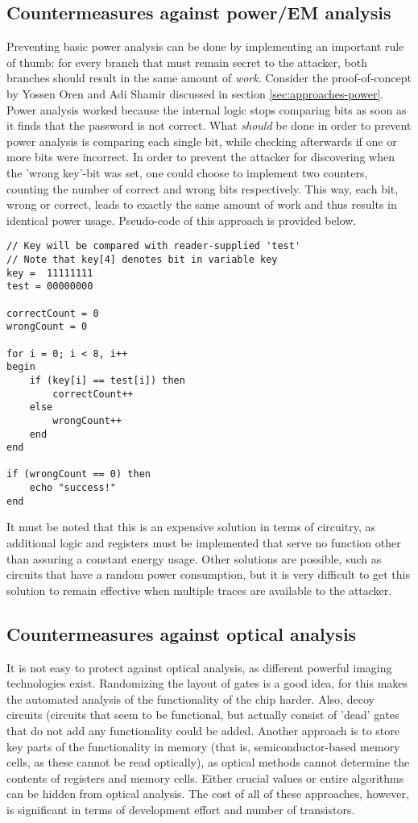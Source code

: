 \documentclass{llncs}
\begin{document}
\subsection{Countermeasures against power/EM analysis}
Preventing basic power analysis can be done by implementing an important rule of thumb: for every branch that must remain secret to the attacker, both branches should result in the same amount of \emph{work}. Consider the proof-of-concept by Yossen Oren and Adi Shamir discussed in section \ref{sec:approaches-power}. Power analysis worked because the internal logic stops comparing bits as soon as it finds that the password is not correct. What \emph{should} be done in order to prevent power analysis is comparing each single bit, while checking afterwards if one or more bits were incorrect. In order to prevent the attacker for discovering when the 'wrong key'-bit was set, one could choose to implement two counters, counting the number of correct and wrong bits respectively. This way, each bit, wrong or correct, leads to exactly the same amount of work and thus results in identical power usage. Pseudo-code of this approach is provided below. 
\pagebreak
\begin{lstlisting}[frame=single]
// Key will be compared with reader-supplied 'test'
// Note that key[4] denotes bit in variable key
key =  11111111
test = 00000000

correctCount = 0
wrongCount = 0

for i = 0; i < 8, i++
begin
	if (key[i] == test[i]) then
		correctCount++
	else
		wrongCount++
	end
end

if (wrongCount == 0) then
	echo "success!"
end
\end{lstlisting}

It must be noted that this is an expensive solution in terms of circuitry, as additional logic and registers must be implemented that serve no function other than assuring a constant energy usage. Other solutions are possible, such as circuits that have a random power consumption, but it is very difficult to get this solution to remain effective when multiple traces are available to the attacker. 

\subsection{Countermeasures against optical analysis}
It is not easy to protect against optical analysis, as different powerful imaging technologies exist. Randomizing the layout of gates is a good idea, for this makes the automated analysis of the functionality of the chip harder. Also, decoy circuits (circuits that seem to be functional, but actually consist of 'dead' gates that do not add any functionality could be added. Another approach is to store key parts of the functionality in memory (that is, semiconductor-based memory cells, as these cannot be read optically), as optical methods cannot determine the contents of registers and memory cells. Either crucial values or entire algorithms can be hidden from optical analysis. The cost of all of these approaches, however, is significant in terms of development effort and number of transistors. 
\end{document}
